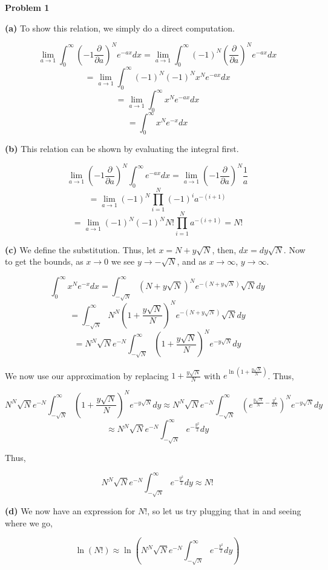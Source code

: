 \documentclass[11pt]{article}
\begin{document}
\textbf{Problem 1}

\textbf{(a)} To show this relation, we simply do a direct computation.

$$\lim_{a \to 1} \int_{0}^{\infty} \left(-1 \frac{\partial}{\partial a} \right)^{N}e^{-ax}dx = \lim_{a \to 1} \int_{0}^{\infty} (-1)^{N} \left(\frac{\partial}{\partial a} \right)^{N}e^{-ax}dx$$
$$ = \lim_{a \to 1} \int_{0}^{\infty} (-1)^{N}(-1)^{N} x^{N}e^{-ax}dx$$
$$ = \lim_{a \to 1} \int_{0}^{\infty} x^{N}e^{-ax}dx$$
$$ = \int_{0}^{\infty} x^{N}e^{-x}dx$$

\textbf{(b)} This relation can be shown by evaluating the integral first.

$$\lim_{a \to 1} \left(-1 \frac{\partial}{\partial a} \right)^{N} \int_{0}^{\infty}e^{-ax}dx = \lim_{a \to 1} \left(-1\frac{\partial}{\partial a}\right)^{N} \frac{1}{a}$$
$$ = \lim_{a\to 1} (-1)^{N} \prod_{i=1}^{N}(-1)^{i}a^{-(i+1)}$$
$$ = \lim_{a\to 1}(-1)^{N}(-1)^{N}N! \prod_{i=1}^{N} a^{-(i+1)} = N!$$

\textbf{(c)} We define the substitution. Thus, let $x = N + y\sqrt{N}$, then, $dx = dy\sqrt{N}$. Now to get the bounds, as $x \to 0$ we see $y \to -\sqrt{N}$, and as $x \to \infty$, $y \to \infty$.

$$\int_{0}^{\infty} x^{N}e^{-x}dx = \int_{-\sqrt{N}}^{\infty} (N+y\sqrt{N})^{N}e^{-(N+y\sqrt{N})}\sqrt{N}dy$$
$$ = \int_{-\sqrt{N}}^{\infty} N^{N}\left(1+\frac{y\sqrt{N}}{N}\right)^{N}e^{-(N+y\sqrt{N})}\sqrt{N}dy$$
$$ =N^{N}\sqrt{N}e^{-N} \int_{-\sqrt{N}}^{\infty} \left(1+\frac{y\sqrt{N}}{N}\right)^{N}e^{-y\sqrt{N}}dy$$

We now use our approximation by replacing $1+\frac{y\sqrt{N}}{N}$ with $e^{\ln(1+\frac{y\sqrt{N}}{N})}$. Thus,

$$N^{N}\sqrt{N}e^{-N} \int_{-\sqrt{N}}^{\infty} \left(1+\frac{y\sqrt{N}}{N}\right)^{N}e^{-y\sqrt{N}}dy\approx N^{N}\sqrt{N}e^{-N} \int_{-\sqrt{N}}^{\infty} \left(e^{\frac{y\sqrt{N}}{N} - \frac{y^{2}}{2N}}\right)^{N}e^{-y\sqrt{N}}dy$$
$$ \approx N^{N}\sqrt{N}e^{-N} \int_{-\sqrt{N}}^{\infty} e^{- \frac{y^{2}}{2}}dy $$

Thus,

$$N^{N}\sqrt{N}e^{-N} \int_{-\sqrt{N}}^{\infty} e^{- \frac{y^{2}}{2}}dy \approx N!$$

\textbf{(d)} We now have an expression for $N!$, so let us try plugging that in and seeing where we go,

$$\ln(N!) \approx \ln(N^{N}\sqrt{N}e^{-N} \int_{-\sqrt{N}}^{\infty} e^{- \frac{y^{2}}{2}}dy)$$
\end{document}
